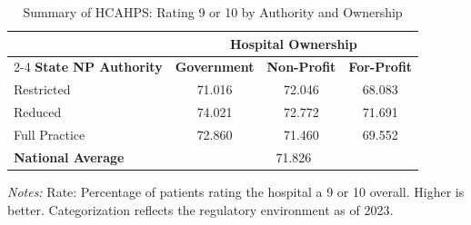 \begin{table}[htbp]
    \centering
    \caption{Summary of HCAHPS: Rating 9 or 10 by Authority and Ownership}
    \label{tab:h_hosp_rating_9_10_own}
    \vspace{0.2cm}
    \begin{tabular}{lccc}
        \toprule
        & \multicolumn{3}{c}{\textbf{Hospital Ownership}} \\
        \cmidrule(lr){2-4}
        \textbf{State NP Authority} & \textbf{Government} & \textbf{Non-Profit} & \textbf{For-Profit} \\
        \midrule
        Restricted & 71.016 & 72.046 & 68.083 \\
        Reduced & 74.021 & 72.772 & 71.691 \\
        Full Practice & 72.860 & 71.460 & 69.552 \\
        \midrule
        \textbf{National Average} & \multicolumn{3}{c}{71.826} \\
        \bottomrule
    \end{tabular}
    \vspace{0.1cm}
    \begin{minipage}{0.85\textwidth}
        \footnotesize \textit{Notes:} Rate: Percentage of patients rating the hospital a 9 or 10 overall. Higher is better. Categorization reflects the regulatory environment as of 2023.
    \end{minipage}
\end{table}